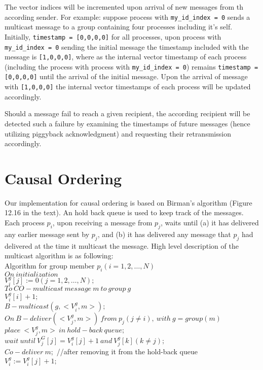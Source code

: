 \documentclass[11pt]{report}
\begin{document}
		The vector indices will be incremented upon arrival of new messages from th according sender.  For example: suppose process with \verb+my_id_index = 0+ sends a multicast message to a group containing four processes including it's self.  Initially, \verb+timestamp = [0,0,0,0]+ for all processes, upon process with \verb+my_id_index = 0+ sending the initial message the timestamp included with the message is  \verb+[1,0,0,0]+, where as the internal vector timestamp of each process (including the process with process with \verb+my_id_index = 0+)  remains \verb+timestamp = [0,0,0,0]+ until the arrival of the initial message.  Upon the arrival of message with  \verb+[1,0,0,0]+ the internal vector timestamps of each process will be updated accordingly.  
		
		Should a message fail to reach a given recipient, the according recipient will be detected such a failure by examining the timestamps of future messages (hence utilizing piggyback acknowledgment) and requesting their retransmission accordingly. 


			\section{Causal Ordering}
		Our implementation for causal ordering is based on Birman's algorithm (Figure 12.16 in the text). An hold back queue is used to keep track of the messages. Each process $p_i$, upon receiving a message from $p_j$, waits until (a) it has delivered any earlier message sent by $p_j$, and (b) it has delivered any message that $p_j$ had delivered at the time it multicast the message. High level description of the multicast algorithm is as following:\\


		Algorithm for group member $p_i( i = 1,2,\dots,N)$\\
		$On \ initialization$\\
		\indent $V_i^g[j]:=0(j= 1,2,\dots,N);$\\
		$To \ CO-multicast \ message \ m \ to \ group \ g$\\
		\indent $V_i^g[i] + 1;$\\
		\indent $B-multicast(g,<V_i^g,m>);$\\
		$On \ B-deliver(<V_j^g, m>) \ from \ p_j(j \neq i), \ with \ g = group(m)$\\
		\indent $place \ <V_j^g, m> \ in \ hold-back \ queue;$\\
		\indent $wait \ until \ V_j^G[j] = V_i^g[j]+1 \ and \ V_j^g[k] (k \neq j);$ \\
		\indent $Co-deliver \ m;$ //after removing it from the hold-back queue\\
		\indent $V_i^g := V_i^g[j] + 1;$
\end{document}
